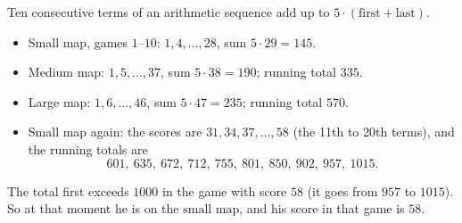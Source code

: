 Ten consecutive terms of an arithmetic sequence add up to $5\cdot(\text{first}+\text{last})$.
\begin{itemize}
\item Small map, games $1$--$10$: $1,4,\dots,28$, sum $5\cdot29=145$.
\item Medium map: $1,5,\dots,37$, sum $5\cdot38=190$; running total $335$.
\item Large map: $1,6,\dots,46$, sum $5\cdot47=235$; running total $570$.
\item Small map again: the scores are $31,34,37,\dots,58$ (the 11th to 20th terms), and the running totals are
\[601,\ 635,\ 672,\ 712,\ 755,\ 801,\ 850,\ 902,\ 957,\ 1015.\]
\end{itemize}
The total first exceeds $1000$ in the game with score $58$ (it goes from $957$ to $1015$). So at that moment he is on the $\boxed{\text{small map}}$, and his score in that game is $\boxed{58}$.
